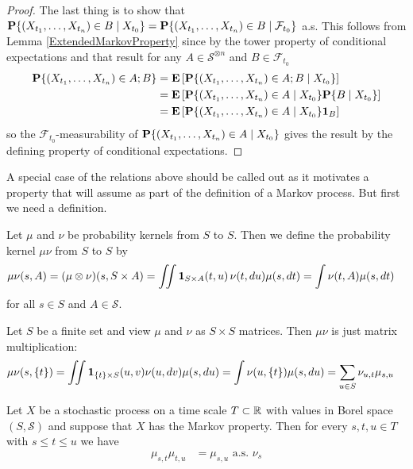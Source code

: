 \begin{proof}
The last thing is to show that
$\cprobability{X_{t_0}}{(X_{t_1},\dotsc, X_{t_n}) \in B} =
\cprobability{\mathcal{F}_{t_0}}{(X_{t_1},\dotsc, X_{t_n}) \in B}$
a.s.  This follows from Lemma \ref{ExtendedMarkovProperty} since by
the tower property of conditional expectations and that result 
for any $A \in \mathcal{S}^{\otimes n}$ and $B \in \mathcal{F}_{t_0}$
\begin{align*}
\probability{(X_{t_1}, \dotsc, X_{t_n}) \in A ; B} 
&=\expectation{\cprobability{X_{t_0}}{(X_{t_1}, \dotsc, X_{t_n}) \in A ;  B}} \\
&=\expectation{\cprobability{X_{t_0}}{(X_{t_1}, \dotsc, X_{t_n}) \in A}
\cprobability{X_{t_0}}{B}} \\
&=\expectation{\cprobability{X_{t_0}}{(X_{t_1}, \dotsc, X_{t_n}) \in A}
\characteristic{B}} \\
\end{align*}
so the $\mathcal{F}_{t_0}$-measurability of
$\cprobability{X_{t_0}}{(X_{t_1}, \dotsc, X_{t_n}) \in A}$ gives the
result by the defining property of conditional expectations.
\end{proof}
A special case of the relations above should be called out as it
motivates a property that will assume as part of the definition of a
Markov process.  But first we need a definition.
\begin{defn}Let $\mu$ and $\nu$ be probability kernels from $S$ to
  $S$.  Then we define the probability kernel $\mu \nu$ from $S$ to
  $S$ by
\begin{align*}
\mu \nu (s, A) 
&= (\mu \otimes \nu)(s,S \times A)
= \iint \characteristic{S \times A}(t,u) \, \nu(t, du) \mu(s, dt) 
= \int \nu(t, A) \mu(s, dt)
\end{align*}
for all $s \in S$ and $A \in \mathcal{S}$.
\end{defn}
\begin{examp}
Let $S$ be a finite set and view $\mu$ and $\nu$ as $S \times S$
matrices.  Then $\mu \nu$ is just matrix multiplication:
\begin{align*}
\mu \nu (s, \lbrace t \rbrace) 
&= \iint \characteristic{\lbrace t  \rbrace \times S}(u,v) \nu(u, dv) \mu(s, du) 
=\int \nu(u, \lbrace t \rbrace) \mu(s,du) 
=\sum_{u \in S} \nu_{u, t} \mu_{s, u}
\end{align*}
\end{examp}
\begin{cor}\label{ChapmanKolmogorovWeak}Let $X$ be a stochastic
  process on a time scale $T \subset \reals$ with values in Borel
  space $(S, \mathcal{S})$ and suppose that $X$ has the Markov
  property.  Then for every $s, t, u \in T$ with $s \leq t \leq u$ we
  have
\begin{align*}
\mu_{s,t} \mu_{t,u} &= \mu_{s,u} \text{ a.s. $\nu_s$}
\end{align*}
\end{cor}
